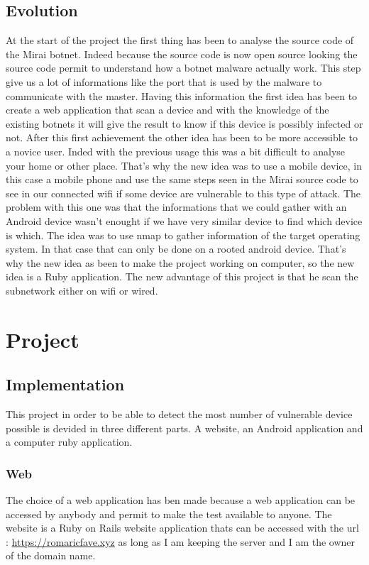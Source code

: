 \documentclass{report}
\begin{document}
\section{Evolution}
At the start of the project the first thing has been to analyse the source code of the Mirai botnet. Indeed because the source code is now open source looking the source code permit to understand how a botnet malware actually work. This step give us a lot of informations like the port that is used by the malware to communicate with the master.\newline
Having this information the first idea has been to create a web application that scan a device and with the knowledge of the existing botnets it will give the result to know if this device is possibly infected or not.\newline
After this first achievement the other idea has been to be more accessible to a novice user. Inded with the previous usage this was a bit difficult to analyse your home or other place.\newline
That's why the new idea was to use a mobile device, in this case a mobile phone and use the same steps seen in the Mirai source code to see in our connected wifi if some device are vulnerable to this type of attack.\newline
The problem with this one was that the informations that we could gather with an Android device wasn't enought if we have very similar device to find which device is which. The idea was to use nmap to gather information of the target operating system. In that case that can only be done on a rooted android device. That's why the new idea as been to make the project working on computer, so the new idea is a Ruby application. The new advantage of this project is that he scan the subnetwork either on wifi or wired.

\chapter{Project}
\section{Implementation}
This project in order to be able to detect the most number of vulnerable device possible is devided in three different parts. A website, an Android application and a computer ruby application.
\subsection{Web}
The choice of a web application has ben made because a web application can be accessed by anybody and permit to make the test available to anyone. The website is a Ruby on Rails website application thats can be accessed with the url : \url{https://romaricfave.xyz} as long as I am keeping the server and I am the owner of the domain name.\newline
\end{document}
